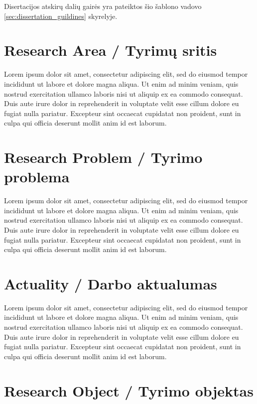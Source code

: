 Disertacijos atskirų dalių gairės yra pateiktos šio šablono vadovo \ref{sec:dissertation_guildines} skyrelyje.


\section*{Research Area / Tyrimų sritis}

Lorem ipsum dolor sit amet, consectetur adipiscing elit, sed do eiusmod tempor incididunt ut labore et dolore magna aliqua. Ut enim ad minim veniam, quis nostrud exercitation ullamco laboris nisi ut aliquip ex ea commodo consequat. Duis aute irure dolor in reprehenderit in voluptate velit esse cillum dolore eu fugiat nulla pariatur. Excepteur sint occaecat cupidatat non proident, sunt in culpa qui officia deserunt mollit anim id est laborum.


\section*{Research Problem / Tyrimo problema}

Lorem ipsum dolor sit amet, consectetur adipiscing elit, sed do eiusmod tempor incididunt ut labore et dolore magna aliqua. Ut enim ad minim veniam, quis nostrud exercitation ullamco laboris nisi ut aliquip ex ea commodo consequat. Duis aute irure dolor in reprehenderit in voluptate velit esse cillum dolore eu fugiat nulla pariatur. Excepteur sint occaecat cupidatat non proident, sunt in culpa qui officia deserunt mollit anim id est laborum.


\section*{Actuality / Darbo aktualumas}

Lorem ipsum dolor sit amet, consectetur adipiscing elit, sed do eiusmod tempor incididunt ut labore et dolore magna aliqua. Ut enim ad minim veniam, quis nostrud exercitation ullamco laboris nisi ut aliquip ex ea commodo consequat. Duis aute irure dolor in reprehenderit in voluptate velit esse cillum dolore eu fugiat nulla pariatur. Excepteur sint occaecat cupidatat non proident, sunt in culpa qui officia deserunt mollit anim id est laborum.


\section*{Research Object / Tyrimo objektas}

